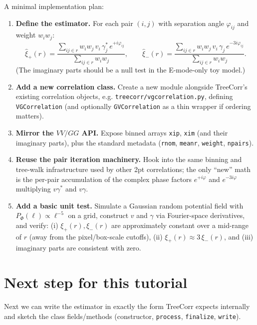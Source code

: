 \documentclass[11pt]{article}
\begin{document}
A minimal implementation plan:
\begin{enumerate}
  \item \textbf{Define the estimator.} For each pair $(i,j)$ with separation angle $\varphi_{ij}$ and weight $w_i w_j$:
  \[
    \hat\xi_+(r) = \frac{\sum_{ij\in r} w_i w_j\, v_i\,\gamma_j^*\,e^{+i\varphi_{ij}}}{\sum_{ij\in r} w_i w_j},\qquad
    \hat\xi_-(r) = \frac{\sum_{ij\in r} w_i w_j\, v_i\,\gamma_j\,e^{-3i\varphi_{ij}}}{\sum_{ij\in r} w_i w_j}.
  \]
  (The imaginary parts should be a null test in the E-mode-only toy model.)

  \item \textbf{Add a new correlation class.} Create a new module alongside TreeCorr's existing correlation objects, e.g. \texttt{treecorr/vgcorrelation.py}, defining \texttt{VGCorrelation} (and optionally \texttt{GVCorrelation} as a thin wrapper if ordering matters).

  \item \textbf{Mirror the $VV/GG$ API.} Expose binned arrays \texttt{xip}, \texttt{xim} (and their imaginary parts), plus the standard metadata (\texttt{rnom}, \texttt{meanr}, \texttt{weight}, \texttt{npairs}).

  \item \textbf{Reuse the pair iteration machinery.} Hook into the same binning and tree-walk infrastructure used by other 2pt correlations; the only ``new'' math is the per-pair accumulation of the complex phase factors $e^{+i\varphi}$ and $e^{-3i\varphi}$ multiplying $v\gamma^*$ and $v\gamma$.

  \item \textbf{Add a basic unit test.} Simulate a Gaussian random potential field with $P_\Phi(\ell)\propto \ell^{-5}$ on a grid, construct $v$ and $\gamma$ via Fourier-space derivatives, and verify:
  (i) $\xi_+(r),\xi_-(r)$ are approximately constant over a mid-range of $r$ (away from the pixel/box-scale cutoffs), (ii) $\xi_+(r)\approx 3\,\xi_-(r)$, and (iii) imaginary parts are consistent with zero.
\end{enumerate}

\section{Next step for this tutorial}
Next we can write the estimator in exactly the form TreeCorr expects internally and sketch the class fields/methods (constructor, \texttt{process}, \texttt{finalize}, \texttt{write}).
\end{document}
